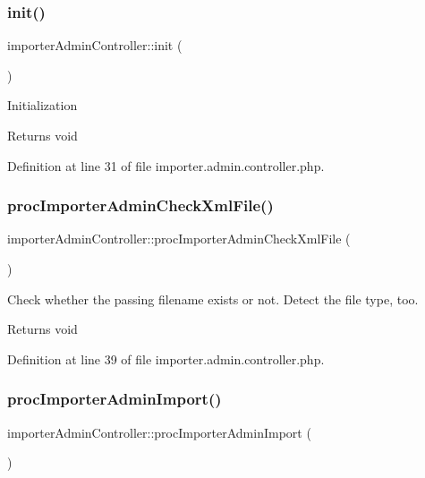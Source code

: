 \subsubsection{\texorpdfstring{init()}{init()}}
{\footnotesize\ttfamily importer\+Admin\+Controller\+::init (\begin{DoxyParamCaption}{ }\end{DoxyParamCaption})}

Initialization \begin{DoxyReturn}{Returns}
void 
\end{DoxyReturn}


Definition at line 31 of file importer.\+admin.\+controller.\+php.

\mbox{\label{classimporterAdminController_aa553a8db633713f858c1064a5b8fa621}} 
\subsubsection{\texorpdfstring{proc\+Importer\+Admin\+Check\+Xml\+File()}{procImporterAdminCheckXmlFile()}}
{\footnotesize\ttfamily importer\+Admin\+Controller\+::proc\+Importer\+Admin\+Check\+Xml\+File (\begin{DoxyParamCaption}{ }\end{DoxyParamCaption})}

Check whether the passing filename exists or not. Detect the file type, too. \begin{DoxyReturn}{Returns}
void 
\end{DoxyReturn}


Definition at line 39 of file importer.\+admin.\+controller.\+php.

\mbox{\label{classimporterAdminController_a51a0e3d1bccf3f7c539b119bf394d572}} 
\subsubsection{\texorpdfstring{proc\+Importer\+Admin\+Import()}{procImporterAdminImport()}}
{\footnotesize\ttfamily importer\+Admin\+Controller\+::proc\+Importer\+Admin\+Import (\begin{DoxyParamCaption}{ }\end{DoxyParamCaption})}

